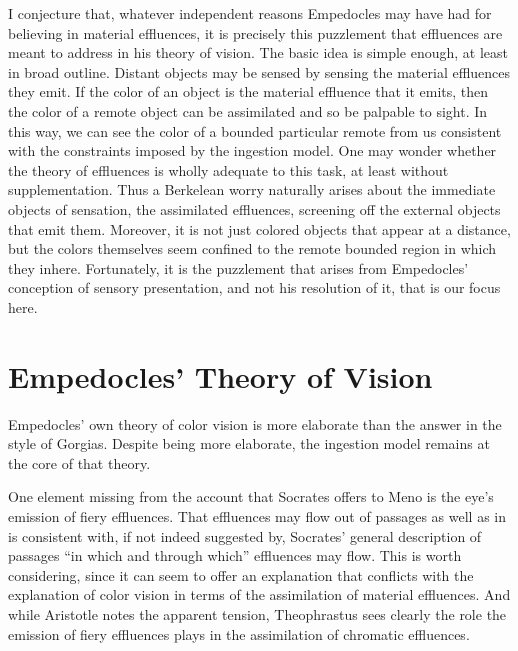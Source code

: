 I conjecture that, whatever independent reasons Empedocles may have had for believing in material effluences, it is precisely this puzzlement that effluences are meant to address in his theory of vision. The basic idea is simple enough, at least in broad outline. Distant objects may be sensed by sensing the material effluences they emit. If the color of an object is the material effluence that it emits, then the color of a remote object can be assimilated and so be palpable to sight. In this way, we can see the color of a bounded particular remote from us  consistent with the constraints imposed by the ingestion model. One may wonder whether the theory of effluences is wholly adequate to this task, at least without supplementation. Thus a Berkelean worry naturally arises about the immediate objects of sensation, the assimilated effluences, screening off the external objects that emit them. Moreover, it is not just colored objects that appear at a distance, but the colors themselves seem confined to the remote bounded region in which they inhere. Fortunately, it is the puzzlement that arises from Empedocles' conception of sensory presentation, and not his resolution of it, that is our focus here. 


\section{Empedocles' Theory of Vision} %
\label{sec:empedocles_theory_of_vision}

Empedocles' own theory of color vision is more elaborate than the answer in the style of Gorgias. Despite being more elaborate, the ingestion model remains at the core of that theory. 

One element missing from the account that Socrates offers to Meno is the eye's emission of fiery effluences. That effluences may flow out of passages as well as in is consistent with, if not indeed suggested by, Socrates' general description of passages ``in which and through which'' effluences may flow. This is worth considering, since it can seem to offer an explanation that conflicts with the explanation of color vision in terms of the assimilation of material effluences. And while Aristotle notes the apparent tension, Theophrastus sees clearly the role the emission of fiery effluences plays in the assimilation of chromatic effluences.

